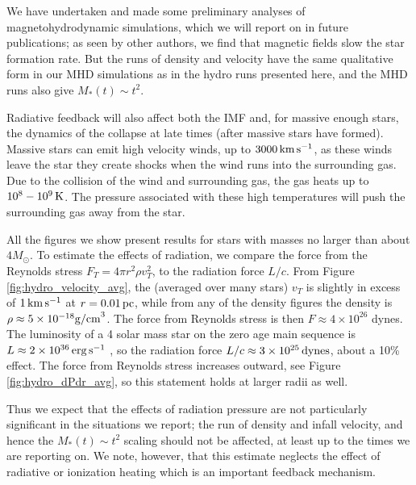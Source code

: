 \documentclass[../dissertation.tex]{subfiles}
\begin{document}
We have undertaken and made some preliminary analyses of magnetohydrodynamic simulations, which we will report on in future publications; 
as seen by other authors, we find that magnetic fields slow the star formation rate. 
But the runs of density and velocity have the same qualitative form in our MHD simulations as in the hydro runs presented here, and the MHD runs also give $M_*(t)\sim t^2$. 


Radiative feedback will also affect both the IMF and, for massive enough stars, the dynamics of the collapse at late times (after massive stars have formed). 
Massive stars can emit high velocity winds, up to $3000 \,\rm km\,s^{-1}$, as these winds leave the star they create shocks when the wind runs into the surrounding gas.
Due to the collision of the wind and surrounding gas, the gas heats up to $10^8 - 10^9 \, \rm K$. 
The pressure associated with these high temperatures will push the surrounding gas away from the star.

All the figures we show present results for stars with masses no larger than about $4 M_\odot$. To estimate the effects of radiation, we compare the force from the Reynolds stress $F_T=4\pi r^2 \rho v_T^2$, to the radiation force $L/c$. 
From Figure \ref{fig:hydro_velocity_avg}, the (averaged over many stars) $v_T$ is slightly in excess of $1\,\rm km\,s^{-1}$ at $r=0.01\,\rm pc$, while from any of the density figures the density is $\rho\approx5\times10^{-18} {\rm g/cm}^3$. The force from Reynolds stress is then $F\approx4\times 10^{26}$ dynes. The luminosity of a 4 solar mass star on the zero age main sequence is $L\approx 2\times10^{36}\,\rm erg\, s^{-1}$ \citep{1992A&AS...96..269S}, so the radiation force $L/c \approx 3\times10^{25}\,{\rm dynes}$, about a 10\% effect.  The force from Reynolds stress increases outward, see Figure \ref{fig:hydro_dPdr_avg}, so this statement holds at larger radii as well. 

Thus we expect that the effects of radiation pressure are not particularly significant in the situations we report;  the run of density and infall velocity, and hence the $M_*(t)\sim t^2$ scaling should not be affected, at least up to the times we are reporting on.  We note, however, that this estimate neglects the effect of radiative or ionization heating which is an important feedback mechanism.
\end{document}
